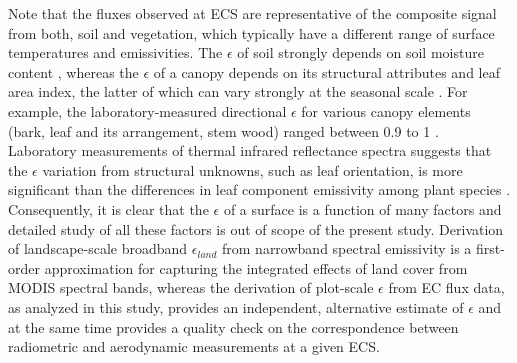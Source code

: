 \documentclass[fleqn,10pt]{wlscirep}
\begin{document}
{{Note that the fluxes observed at ECS are representative of the composite signal from both, soil and vegetation, which typically have a different range of surface temperatures and emissivities\cite{jin2006improved}. The $\epsilon$ of soil strongly depends on soil moisture content \cite{mira2007influence}, whereas the $\epsilon$ of a canopy depends on its structural attributes and leaf area index, the latter of which can vary strongly at the seasonal scale \cite{chen2015determining}. For example, the laboratory-measured directional $\epsilon$ for various canopy elements (bark, leaf and its arrangement, stem wood) ranged between 0.9 to 1 \cite{vishnevetsky2019method}. Laboratory measurements of thermal infrared reflectance spectra suggests that the $\epsilon$ variation from structural unknowns, such as leaf orientation, is more significant than the differences in leaf component emissivity among plant species \cite{snyder1998classification}. Consequently, it is clear that the $\epsilon$ of a surface is a function of many factors and detailed study of all these factors is out of scope of the present study. Derivation of landscape-scale broadband $\epsilon_{land}$ from narrowband spectral emissivity is a first-order approximation for capturing the integrated effects of land cover from MODIS spectral bands\cite{jin2006improved}, whereas the derivation of plot-scale $\epsilon$ from EC flux data, as analyzed in this study, provides an independent, alternative estimate of $\epsilon$ and at the same time provides a quality check on the correspondence between radiometric and aerodynamic measurements at a given ECS.

}}
\end{document}
